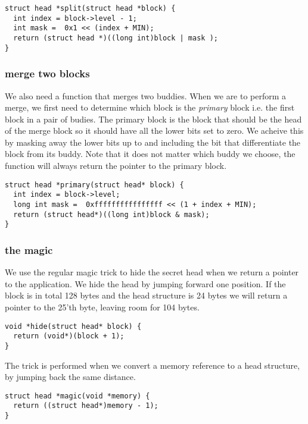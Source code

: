 \documentclass[a4paper,11pt]{article}
\begin{document}
\begin{lstlisting}
struct head *split(struct head *block) {
  int index = block->level - 1;
  int mask =  0x1 << (index + MIN);
  return (struct head *)((long int)block | mask );
}
\end{lstlisting}


\subsubsection*{merge  two blocks}

We also need a function that merges two buddies. When we are to
perform a merge, we first need to determine which block is the {\em
  primary} block i.e. the first block in a pair of budies. The primary
block is the block that should be the head of the merge block so it
should have all the lower bits set to zero. We acheive this by masking
away the lower bits up to and including the bit that differentiate the
block from its buddy. Note that it does not matter which buddy we
choose, the function will always return the pointer to the primary
block.

\begin{lstlisting}
struct head *primary(struct head* block) {
  int index = block->level;
  long int mask =  0xffffffffffffffff << (1 + index + MIN);
  return (struct head*)((long int)block & mask);
}
\end{lstlisting}


\subsubsection*{the magic}

We use the regular magic trick to hide the secret head when we return a
pointer to the application. We hide the head by jumping forward one
position. If the block is in total 128 bytes and the head structure is
24 bytes we will return a pointer to the 25'th byte, leaving room for 104
bytes.

\begin{lstlisting}
void *hide(struct head* block) {
  return (void*)(block + 1);
}
\end{lstlisting}

The trick is performed when we convert a memory reference to a head structure, by
jumping back the same distance.

\begin{lstlisting}
struct head *magic(void *memory) {
  return ((struct head*)memory - 1);
}
\end{lstlisting}
\end{document}
